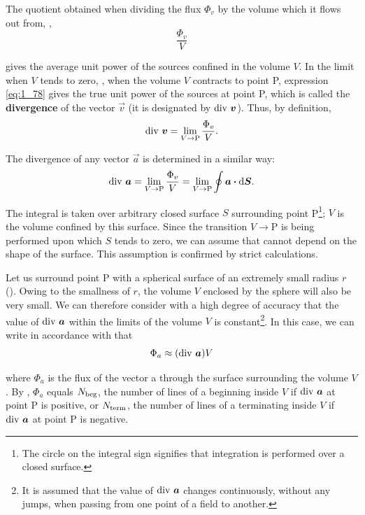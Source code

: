 The quotient obtained when dividing the flux $\Phi_v$ by the volume which it flows out from, \ie,
\begin{equation}\label{eq:1_78}
	\frac{\Phi_v}{V}
\end{equation}

\noindent
gives the average unit power of the sources confined in the volume $V$. In the limit when $V$ tends to zero, \ie, when the volume $V$ contracts to point P, expression \eqref{eq:1_78} gives the true unit power of the sources at point P, which is called the \textbf{divergence} of the vector $\vec{v}$ (it is designated by $\text{div~}\boldsymbol{v}$). Thus, by definition,
\begin{equation*}
	\text{div~}\boldsymbol{v} = \lim_{V\to \text{P}} \frac{\Phi_v}{V}.
\end{equation*}

\noindent
The divergence of any vector $\vec{a}$ is determined in a similar way:
\begin{equation}\label{eq:1_79}
	\text{div~}\boldsymbol{a} = \lim_{V\to \text{P}} \frac{\Phi_v}{V} = \lim_{V\to \text{P}} \oint \boldsymbol{a} \boldsymbol{\cdot} \mathrm{d}\boldsymbol{S}.
\end{equation}

\noindent
The integral is taken over arbitrary closed surface $S$ surrounding point P\footnote{The circle on the integral sign signifies that integration is performed over a closed surface.}; $V$ is the volume confined by this surface. Since the transition $V\to$P is being performed upon which $S$ tends to zero, we can assume that  cannot depend on the shape of the surface. This assumption is confirmed by strict calculations.

Let us surround point P with a spherical surface of an extremely small radius $r$ (). Owing to the smallness of $r$, the volume $V$ enclosed by the sphere will also be very small. We can therefore consider with a high degree of accuracy that the value of $\text{div~}\boldsymbol{a}$ within the limits of the volume $V$ is constant\footnote{It is assumed that the value of $\text{div~}\boldsymbol{a}$ changes continuously, without any jumps, when passing from one point of a field to another.}. In this case, we can write in accordance with  that
\begin{equation*}
	\Phi_a \approx (\text{div~}\boldsymbol{a}) V
\end{equation*}

\noindent
where $\Phi_a$ is the flux of the vector a through the surface surrounding the volume $V$. By , $\Phi_a$ equals $N_{\text{beg}}$, the number of lines of a beginning inside $V$ if $\text{div~}\boldsymbol{a}$ at point P is positive, or $N_{\text{term}}$, the number of lines of a terminating inside $V$ if $\text{div~}\boldsymbol{a}$ at point P is negative.


